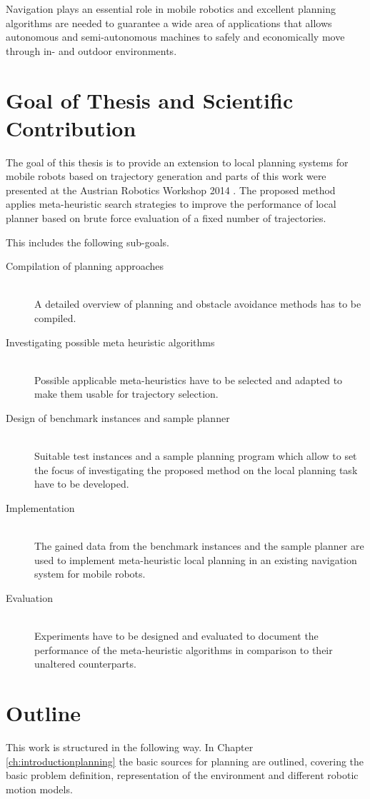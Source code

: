 Navigation plays an essential role in mobile robotics and excellent planning algorithms are needed to guarantee a wide area of applications that allows autonomous and semi-autonomous machines to safely and economically move through in- and outdoor environments.

\section{Goal of Thesis and Scientific Contribution}\label{sec:goal}
The goal of this thesis is to provide an extension to local planning systems for mobile robots based on trajectory generation and parts of this work were presented at the Austrian Robotics Workshop 2014 \cite{myself}. 
The proposed method applies meta-heuristic search strategies to improve the performance of local planner based on brute force evaluation of a fixed number of trajectories.

This includes the following sub-goals.
\begin{description}
\item[Compilation of planning approaches]\hfill \\
A detailed overview of planning and obstacle avoidance methods has to be compiled. 
\item[Investigating possible meta heuristic algorithms]\hfill \\
Possible applicable meta-heuristics have to be selected and adapted to make them usable for trajectory selection.
\item[Design of benchmark instances and sample planner]\hfill \\
Suitable test instances and a sample planning program which allow to set the focus of investigating the proposed method on the local planning task have to be developed.  
\item[Implementation]\hfill \\
The gained data from the benchmark instances and the sample planner are used to implement meta-heuristic local planning in an existing navigation system for mobile robots.  
\item[Evaluation]\hfill \\
Experiments have to be designed and evaluated to document the performance of the meta-heuristic algorithms in comparison to their unaltered counterparts.
\end{description}

\section{Outline}\label{sec:outline}
This work is structured in the following way. 
In Chapter \ref{ch:introductionplanning} the basic sources for planning are outlined, covering the basic problem definition, representation of the environment and different robotic motion models. 


